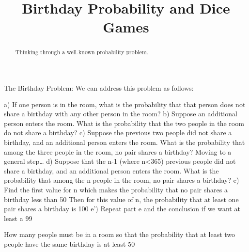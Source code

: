\documentclass{ximera}
\title[Break-Ground:]{Birthday Probability and Dice Games}
\begin{document}
\begin{abstract}
  Thinking through a well-known probability problem.
\end{abstract}
\maketitle


The Birthday Problem:  
We can address this problem as follows:

a)  If one person is in the room, what is the probability that that person does not share a birthday with any other person in the room?
b)  Suppose an additional person enters the room.  What is the probability that the two people in the room do not share a birthday?
c)  Suppose the previous two people did not share a birthday, and an additional person enters the room.  What is the probability that among the three people in the room, no pair shares a birthday?
Moving to a general step…
d)  Suppose that the n-1 (where n<365) previous people did not share a birthday, and an additional person enters the room.  What is the probability that among the n people in the room, no pair shares a birthday?
e)  Find the first value for n which makes the probability that no pair shares a birthday less than 50%
Then for this value of n, the probability that at least one pair shares a birthday is 100%
e’)  Repeat part e and the conclusion if we want at least a 99%



\begin{problem}
  How many people must be in a room so that the probability that at least two people have the same birthday is at least 50%
  \begin{multipleChoice}
  \end{multipleChoice}
\end{problem}
\end{document}
